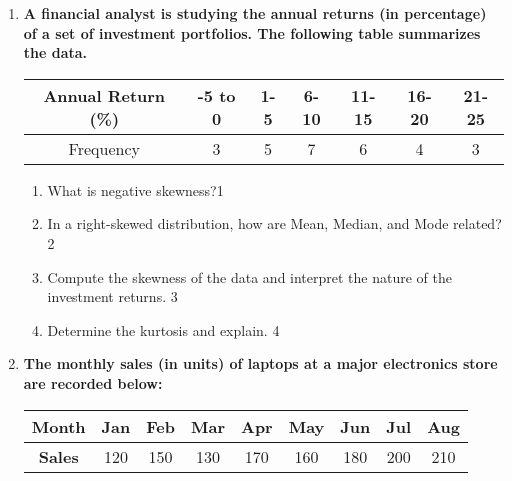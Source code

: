 \documentclass[12pt]{article}
\begin{document}
\begin{enumerate}
\begin{enumerate}
 \item How many types of moments are there?  \hfill 1
  \item 	Derive the value of thew first central moment. \footnote{$\frac{\sum(x_i-\bar x}{n} = \bar x - \bar x) = 0$} \hfill 2
\item
Calculate the first four moments about 3. \hfill 3
\item
Compute the variance and kurtosis of the data using converted central moments. 
Explain what the kurtosis indicates about the distribution. \hfill 4
\end{enumerate}

  \item  
  \textbf{A financial analyst is studying the annual returns (in percentage) of a set of investment portfolios. The following table summarizes the data.}  

\begin{table}[h]
\centering
\begin{tabular}{c|cccccc}
Annual Return (\%) & -5 to 0 & 1-5 & 6-10 & 11-15 & 16-20 & 21-25 \\ \hline
Frequency & 3 & 5 & 7 & 6 & 4 & 3
\end{tabular}
\end{table}

  \begin{enumerate}
   \item What is negative skewness?\hfill 1
    \item In a right-skewed distribution, how are Mean, Median, and Mode related?  \hfill 2
    \item  
	Compute the skewness of the data and interpret the nature of the investment returns.  \hfill 3  
    \item  
	Determine the kurtosis and explain.  \hfill 4  
  \end{enumerate}  
  
  \item
\textbf{The monthly sales (in units) of laptops at a major electronics store are recorded below:} 

\begin{table}[h]
\centering
\begin{tabular}{c|cccccccc}
\textbf{Month} & Jan & Feb & Mar & Apr & May & Jun & Jul & Aug \\ \hline
\textbf{Sales} & 120 & 150 & 130 & 170 & 160 & 180 & 200 & 210
\end{tabular}
\end{table}


\end{enumerate}
\end{document}
